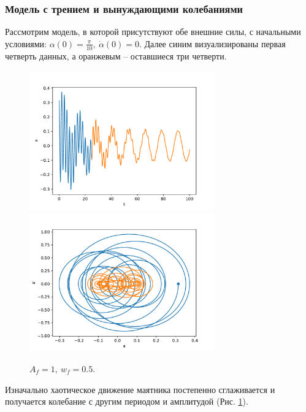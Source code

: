         \subsubsection{Модель с трением и вынуждающими колебаниями}
            Рассмотрим модель, в которой присутствуют обе внешние силы, с начальными условиями: $\alpha(0) = \frac{\pi}{10}, ~ \dot{\alpha}(0) = 0$. Далее синим визуализированы первая четверть данных, а оранжевым -- оставшиеся три четверти.
            \begin{figure}[H]
                \centering
                \includegraphics[width=8cm]{pictures/5resonance1.pdf}
                \includegraphics[width=8cm]{pictures/5resonance1p.pdf}
                \caption{$A_f = 1, ~ w_f = 0.5$.}\label{kw05}
            \end{figure}
            Изначально хаотическое движение маятника постепенно сглаживается и получается колебание с другим периодом и амплитудой (Рис. \ref{kw05}).

